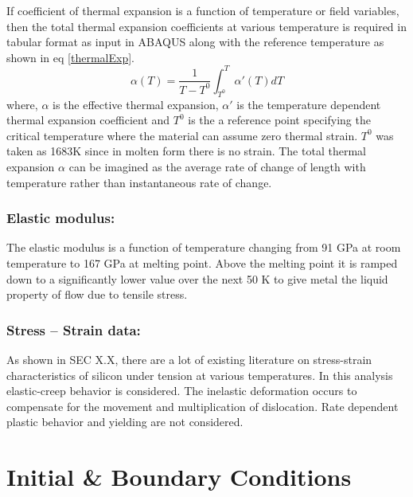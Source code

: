 If coefficient of thermal expansion is a function of temperature or field variables, then the total thermal expansion coefficients at various temperature is required in tabular format as input in ABAQUS along with the reference temperature as shown in eq \ref{thermalExp}.
\begin{equation}
\alpha(T) = \frac{1}{T-T^{0}}\int_{T^{0}}^{T} {\alpha}'(T)dT
\label {thermalExp}
\end{equation}
where, $\alpha$ is the effective thermal expansion, ${\alpha}'$ is the temperature dependent thermal expansion coefficient and $T^{0}$ is the a reference point specifying the critical temperature where the material can assume zero thermal strain. $T^{0}$ was taken as 1683K since in molten form there is no strain. The total thermal expansion $\alpha$ can be imagined as the average rate of change of length with temperature rather than instantaneous rate of change.  

\subsubsection{Elastic modulus:}

The elastic modulus is a function of temperature changing from 91 GPa at room temperature to 167 GPa at melting point. Above the melting point it is ramped down to a significantly lower value over the next 50 K to give metal the liquid property of flow due to tensile stress.

\subsubsection{Stress – Strain data:}

As shown in SEC X.X, there are a lot of existing literature on stress-strain characteristics of silicon under tension at various temperatures. In this analysis elastic-creep behavior is considered. The inelastic deformation occurs to compensate for the movement and multiplication of dislocation. Rate dependent plastic behavior and yielding are not considered.


\section{Initial \& Boundary Conditions}


